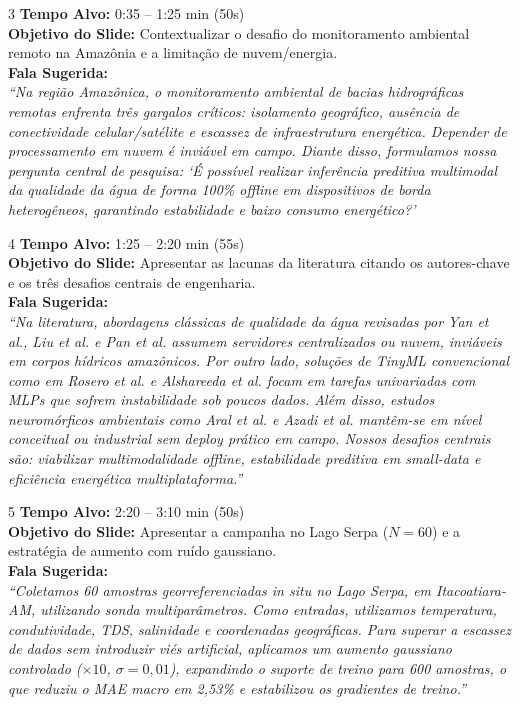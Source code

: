 \documentclass[11pt,a4paper]{article}
\begin{document}
\begin{slidebox}{3}
\textbf{Tempo Alvo:} 0:35 -- 1:25 min (50s)\\[3pt]
\textbf{Objetivo do Slide:} Contextualizar o desafio do monitoramento ambiental remoto na Amazônia e a limitação de nuvem/energia.\\[3pt]
\textbf{Fala Sugerida:}\\
\textit{``Na região Amazônica, o monitoramento ambiental de bacias hidrográficas remotas enfrenta três gargalos críticos: isolamento geográfico, ausência de conectividade celular/satélite e escassez de infraestrutura energética. Depender de processamento em nuvem é inviável em campo. Diante disso, formulamos nossa pergunta central de pesquisa: `É possível realizar inferência preditiva multimodal da qualidade da água de forma 100\% offline em dispositivos de borda heterogêneos, garantindo estabilidade e baixo consumo energético?'}
\end{slidebox}

\begin{slidebox}{4}
\textbf{Tempo Alvo:} 1:25 -- 2:20 min (55s)\\[3pt]
\textbf{Objetivo do Slide:} Apresentar as lacunas da literatura citando os autores-chave e os três desafios centrais de engenharia.\\[3pt]
\textbf{Fala Sugerida:}\\
\textit{``Na literatura, abordagens clássicas de qualidade da água revisadas por Yan et al., Liu et al. e Pan et al. assumem servidores centralizados ou nuvem, inviáveis em corpos hídricos amazônicos. Por outro lado, soluções de TinyML convencional como em Rosero et al. e Alshareeda et al. focam em tarefas univariadas com MLPs que sofrem instabilidade sob poucos dados. Além disso, estudos neuromórficos ambientais como Aral et al. e Azadi et al. mantêm-se em nível conceitual ou industrial sem deploy prático em campo. Nossos desafios centrais são: viabilizar multimodalidade offline, estabilidade preditiva em small-data e eficiência energética multiplataforma.''}
\end{slidebox}

\begin{slidebox}{5}
\textbf{Tempo Alvo:} 2:20 -- 3:10 min (50s)\\[3pt]
\textbf{Objetivo do Slide:} Apresentar a campanha no Lago Serpa ($N=60$) e a estratégia de aumento com ruído gaussiano.\\[3pt]
\textbf{Fala Sugerida:}\\
\textit{``Coletamos 60 amostras georreferenciadas in situ no Lago Serpa, em Itacoatiara-AM, utilizando sonda multiparâmetros. Como entradas, utilizamos temperatura, condutividade, TDS, salinidade e coordenadas geográficas. Para superar a escassez de dados sem introduzir viés artificial, aplicamos um aumento gaussiano controlado ($\times 10$, $\sigma = 0{,}01$), expandindo o suporte de treino para 600 amostras, o que reduziu o MAE macro em 2,53\% e estabilizou os gradientes de treino.''}
\end{slidebox}
\end{document}
